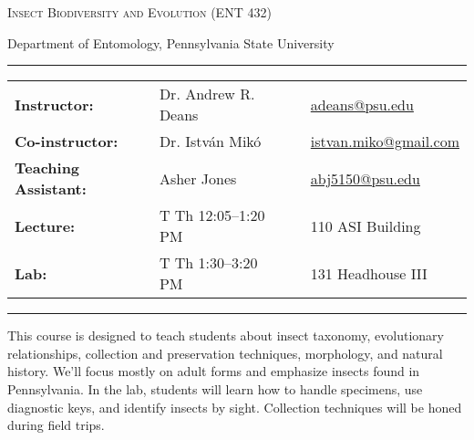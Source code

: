 \documentclass[11pt]{article}
\begin{document}
\begin{center}
{\huge \textsc{Insect Biodiversity and Evolution (ENT 432)}}
\end{center}
\begin{center}
Department of Entomology, Pennsylvania State University\end{center}

\begin{center}
\rule{6in}{0.4pt}
\begin{minipage}[t]{.74\textwidth}
\begin{tabular}{llcl}
\textbf{Instructor:} & Dr. Andrew R. Deans & &  \href{mailto:adeans@psu.edu}{adeans@psu.edu} \\
\textbf{Co-instructor:} & Dr. Istv\'an Mik\'o & &  \href{mailto:istvan.miko@gmail.com}{istvan.miko@gmail.com} \\
\textbf{Teaching Assistant:} & Asher Jones & &  \href{mailto:abj5150@psu.edu}{abj5150@psu.edu} \\
\textbf{Lecture:} & T Th 12:05--1:20 PM & & 110 ASI Building \\
\textbf{Lab:} & T Th 1:30--3:20 PM & & 131 Headhouse III \\
\end{tabular}
\end{minipage}
\rule{6in}{0.4pt}
\end{center}
\vspace{.3cm}
\setlength{\unitlength}{1in}
\renewcommand{\arraystretch}{2}

This course is designed to teach students about insect taxonomy, evolutionary relationships, collection and preservation techniques, morphology, and natural history. We'll focus mostly on adult forms and emphasize insects found in Pennsylvania. In the lab, students will learn how to handle specimens, use diagnostic keys, and identify insects by sight. Collection techniques will be honed during field trips. 
\end{document}
